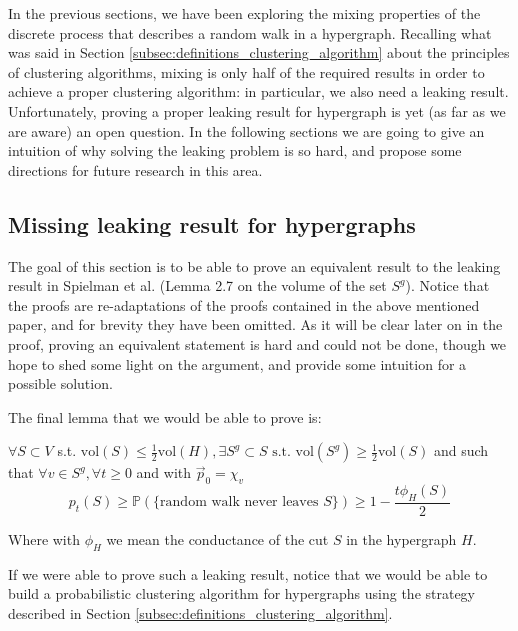 \documentclass[../main.tex]{subfiles}
\begin{document}
    
In the previous sections, we have been exploring the mixing properties of the discrete process that describes a random walk in a hypergraph. Recalling what was said in Section \ref{subsec:definitions_clustering_algorithm} about the principles of clustering algorithms, mixing is only half of the required results in order to achieve a proper clustering algorithm: in particular, we also need a leaking result. Unfortunately, proving a proper leaking result for hypergraph is yet (as far as we are aware) an open question. In the following sections we are going to give an intuition of why solving the leaking problem is so hard, and propose some directions for future research in this area.

\subsection{Missing leaking result for hypergraphs}
\label{subsec:leaking_for_hypergraphs}

    The goal of this section is to be able to prove an equivalent result to the leaking result in Spielman et al. \cite{SpielmanClustering} (Lemma 2.7 on the volume of the set $S^g$). Notice that the proofs are re-adaptations of the proofs contained in the above mentioned paper, and for brevity they have been omitted. As it will be clear later on in the proof, proving an equivalent statement is hard and could not be done, though we hope to shed some light on the argument, and provide some intuition for a possible solution.
    
    The final lemma that we would be able to prove is:
    
    \begin{lemma}
        $\forall S\subset V$ s.t. $\text{vol}(S)\leq \frac{1}{2}\text{vol}(H), \exists S^g\subset S \text{ s.t. } \text{vol}(S^g) \geq \frac{1}{2}\text{vol}(S)$ and such that $\forall v\in S^g, \forall t\geq 0$ and with $\vec{p}_0 = \chi_v$  \\
        \begin{equation}
        p_t(S) \geq \mathbb{P}(\{\text{random walk never leaves } S\}) \geq 1 - \frac{t\phi_H(S)}{2}
        \end{equation}
        
        Where with $\phi_H$ we mean the conductance of the cut $S$ in the hypergraph $H$.
    \end{lemma}
    
    If we were able to prove such a leaking result, notice that we would be able to build a probabilistic clustering algorithm for hypergraphs using the strategy described in Section \ref{subsec:definitions_clustering_algorithm}.
    
\end{document}
